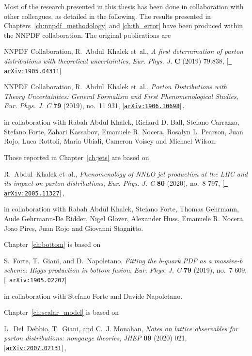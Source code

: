 
Most of the research presented in this thesis has been done in collaboration with other colleagues,
as detailed in the following.
The results presented in Chapters~\ref{ch:nnpdf_methodology} and \ref{ch:th_error}
have been produced within the NNPDF collaboration. The original publications are

NNPDF Collaboration, R.~Abdul~Khalek et~al., {\it {A first determination
  of parton distributions with theoretical uncertainties}},  {\em Eur. Phys.
  J.} {\bf C} (2019) 79:838, [\href{http://arxiv.org/abs/1905.04311}{{\tt
  arXiv:1905.04311}}]

NNPDF Collaboration, R.~Abdul~Khalek et~al., {\it {Parton Distributions
  with Theory Uncertainties: General Formalism and First Phenomenological
  Studies}},  {\em Eur. Phys. J. C} {\bf 79} (2019), no.~11 931,
  [\href{http://arxiv.org/abs/1906.10698}{{\tt arXiv:1906.10698}}]\,,

in collaboration with Rabah Abdul Khalek, Richard D. Ball, Stefano Carrazza, Stefano Forte,
Zahari Kassabov, Emanuele R. Nocera, Rosalyn L. Pearson, Juan Rojo, Luca Rottoli,
Maria Ubiali, Cameron Voisey and Michael Wilson.


Those reported in Chapter~\ref{ch:jets} are based on 

R.~Abdul~Khalek et~al., {\it {Phenomenology of NNLO jet production at the LHC
  and its impact on parton distributions}},  {\em Eur. Phys. J. C} {\bf 80}
  (2020), no.~8 797, [\href{http://arxiv.org/abs/2005.11327}{{\tt
  arXiv:2005.11327}}]\,,

in collaboration with Rabah Abdul Khalek, Stefano Forte, Thomas Gehrmann, Aude Gehrmann-De Ridder,
Nigel Glover, Alexander Huss, Emanuele R. Nocera, Joao Pires, Juan Rojo and Giovanni Stagnitto.

Chapter~\ref{ch:bottom} is based on

S.~Forte, T.~Giani, and D.~Napoletano, {\it {Fitting the b-quark PDF as a
  massive-b scheme: Higgs production in bottom fusion}},  {\em Eur. Phys. J. C}
  {\bf 79} (2019), no.~7 609, [\href{http://arxiv.org/abs/1905.02207}{{\tt
  arXiv:1905.02207}}]

in collaboration with Stefano Forte and Davide Napoletano.

Chapter~\ref{ch:scalar_model} is based on

L.~Del~Debbio, T.~Giani, and C.~J. Monahan, {\it {Notes on lattice observables
  for parton distributions: nongauge theories}},  {\em JHEP} {\bf 09} (2020)
  021, [\href{http://arxiv.org/abs/2007.02131}{{\tt arXiv:2007.02131}}]\,,

